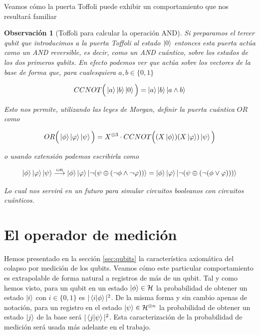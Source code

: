 \documentclass[11pt, spanish]{report}
\numberwithin{equation}{section}
\newtheorem{obs}[defin]{Observación}
\numberwithin{defin}{section}
\begin{document}
Veamos cómo la puerta Toffoli puede exhibir un comportamiento que nos resultará familiar

\begin{obs}[Toffoli para calcular la operación AND]
Si preparamos el tercer qubit que introducimos a la puerta Toffoli al estado $\ket{0}$ entonces esta puerta actúa como un AND reversible, es decir, como un AND cuántico, sobre los estados de los dos primeros qubits. En efecto podemos ver que actúa sobre los vectores de la base de forma que, para cualesquiera $a,b\in\{0,1\}$

\begin{equation}
CCNOT\Big(\ket{a}\ket{b}\ket{0}\Big)=\ket{a}\ket{b}\ket{a\wedge b}
\end{equation}

Esto nos permite, utilizando las leyes de Morgan, definir la puerta cuántica $OR$ como

\begin{equation}
OR\Big(\ket{\phi}\ket{\varphi}\ket{\psi}\Big)=X^{\otimes 3}\cdot CCNOT\Big((X\ket{\phi})(X\ket{\varphi})\ket{\psi}\Big)
\end{equation}

o usando extensión podemos escribirla como

\begin{equation}
\ket{\phi}\ket{\varphi}\ket{\psi}\mathrel{\stackrel{\makebox[0pt]{\mbox{\normalfont\tiny OR}}}{\longrightarrow}}\ket{\phi}\ket{\varphi}\ket{\lnot(\psi\oplus(\lnot \phi \wedge \lnot \varphi))}=\ket{\phi}\ket{\varphi}\ket{\lnot(\psi\oplus(\lnot (\phi \vee \varphi)))}
\end{equation}

Lo cual nos servirá en un futuro para simular circuitos booleanos con circuitos cuánticos.\\

\end{obs}

\section{El operador de medición}

Hemos presentado en la sección \ref{sec:qubits} la característica axiomática del colapso por medición de los qubits. Veamos cómo este particular comportamiento es extrapolable de forma natural a registros de más de un qubit. Tal y como hemos visto, para un qubit en un estado $\ket{\phi}\in\mathcal{H}$ la probabilidad de obtener un estado $\ket{i}$ con $i\in\{0,1\}$ es $|\bra{i}\ket{\phi}|^2$. De la misma forma y sin cambio apenas de notación, para un registro en el estado $\ket{\psi}\in\mathcal{H}^{\otimes n}$ la probabilidad de obtener un estado $\ket{j}$ de la base será $|\bra{j}\ket{\psi}|^2$. Esta caracterización de la probabilidad de medición será usada más adelante en el trabajo.\\
\end{document}
